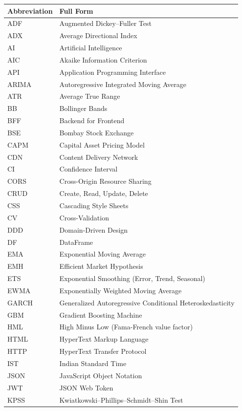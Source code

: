 \documentclass[12pt, a4paper, oneside]{report}
\begin{document}
\begin{longtable}{@{}l p{12cm}@{}}
\toprule
\textbf{Abbreviation} & \textbf{Full Form} \\
\midrule
\endhead
ADF & Augmented Dickey--Fuller Test \\
ADX & Average Directional Index \\
AI & Artificial Intelligence \\
AIC & Akaike Information Criterion \\
API & Application Programming Interface \\
ARIMA & Autoregressive Integrated Moving Average \\
ATR & Average True Range \\
BB & Bollinger Bands \\
BFF & Backend for Frontend \\
BSE & Bombay Stock Exchange \\
CAPM & Capital Asset Pricing Model \\
CDN & Content Delivery Network \\
CI & Confidence Interval \\
CORS & Cross-Origin Resource Sharing \\
CRUD & Create, Read, Update, Delete \\
CSS & Cascading Style Sheets \\
CV & Cross-Validation \\
DDD & Domain-Driven Design \\
DF & DataFrame \\
EMA & Exponential Moving Average \\
EMH & Efficient Market Hypothesis \\
ETS & Exponential Smoothing (Error, Trend, Seasonal) \\
EWMA & Exponentially Weighted Moving Average \\
GARCH & Generalized Autoregressive Conditional Heteroskedasticity \\
GBM & Gradient Boosting Machine \\
HML & High Minus Low (Fama-French value factor) \\
HTML & HyperText Markup Language \\
HTTP & HyperText Transfer Protocol \\
IST & Indian Standard Time \\
JSON & JavaScript Object Notation \\
JWT & JSON Web Token \\
KPSS & Kwiatkowski--Phillips--Schmidt--Shin Test \\

\end{longtable}
\end{document}
